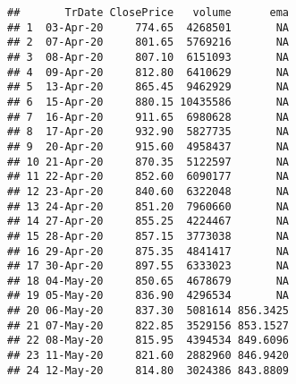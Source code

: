 \documentclass[
]{article}
\begin{document}
\begin{verbatim}
##       TrDate ClosePrice   volume      ema
## 1  03-Apr-20     774.65  4268501       NA
## 2  07-Apr-20     801.65  5769216       NA
## 3  08-Apr-20     807.10  6151093       NA
## 4  09-Apr-20     812.80  6410629       NA
## 5  13-Apr-20     865.45  9462929       NA
## 6  15-Apr-20     880.15 10435586       NA
## 7  16-Apr-20     911.65  6980628       NA
## 8  17-Apr-20     932.90  5827735       NA
## 9  20-Apr-20     915.60  4958437       NA
## 10 21-Apr-20     870.35  5122597       NA
## 11 22-Apr-20     852.60  6090177       NA
## 12 23-Apr-20     840.60  6322048       NA
## 13 24-Apr-20     851.20  7960660       NA
## 14 27-Apr-20     855.25  4224467       NA
## 15 28-Apr-20     857.15  3773038       NA
## 16 29-Apr-20     875.35  4841417       NA
## 17 30-Apr-20     897.55  6333023       NA
## 18 04-May-20     850.65  4678679       NA
## 19 05-May-20     836.90  4296534       NA
## 20 06-May-20     837.30  5081614 856.3425
## 21 07-May-20     822.85  3529156 853.1527
## 22 08-May-20     815.95  4394534 849.6096
## 23 11-May-20     821.60  2882960 846.9420
## 24 12-May-20     814.80  3024386 843.8809
\end{verbatim}
\end{document}
